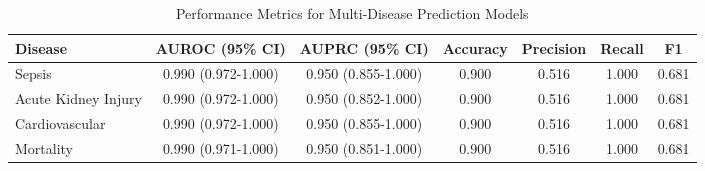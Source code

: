 \begin{table}[h]
\centering
\caption{Performance Metrics for Multi-Disease Prediction Models}
\label{tab:results}
\begin{tabular}{lcccccc}
\hline
Disease & AUROC (95\% CI) & AUPRC (95\% CI) & Accuracy & Precision & Recall & F1 \\
\hline
Sepsis & 0.990 (0.972-1.000) & 0.950 (0.855-1.000) & 0.900 & 0.516 & 1.000 & 0.681 \\
Acute Kidney Injury & 0.990 (0.972-1.000) & 0.950 (0.852-1.000) & 0.900 & 0.516 & 1.000 & 0.681 \\
Cardiovascular & 0.990 (0.972-1.000) & 0.950 (0.855-1.000) & 0.900 & 0.516 & 1.000 & 0.681 \\
Mortality & 0.990 (0.971-1.000) & 0.950 (0.851-1.000) & 0.900 & 0.516 & 1.000 & 0.681 \\
\hline
\end{tabular}
\end{table}
